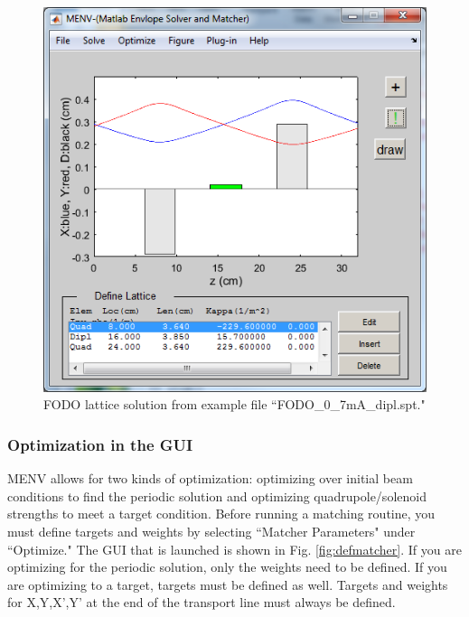 \documentclass[../menv_main.tex]{subfiles}
\begin{document}
\begin{figure}
\centering
\includegraphics{figures/maingui_fodo.png}
\caption{FODO lattice solution from example file ``FODO\_0\_7mA\_dipl.spt."}
\label{fig:fodo}
\end{figure}

\clearpage
\subsubsection{Optimization in the GUI}

MENV allows for two kinds of optimization: optimizing over initial beam conditions to find the periodic solution and optimizing quadrupole/solenoid strengths to meet a target condition. Before running a matching routine, you must define targets and weights by selecting ``Matcher Parameters" under ``Optimize." The GUI that is launched is shown in Fig. \ref{fig:defmatcher}. If you are optimizing for the periodic solution, only the weights need to be defined. 
If you are optimizing to a target, targets must be defined as well. Targets and weights for X,Y,X',Y' at the end of the transport line must always be defined. 
\end{document}
